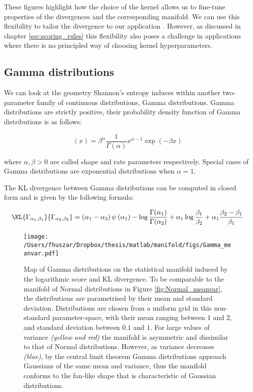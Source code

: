 These figures highlight how the choice of the kernel allows us to fine-tune properties of the divergences and the corresponding manifold. We can use this flexibility to tailor the divergence to our application \citep{tailoring}. However, as discussed in chapter \ref{sec:scoring_rules} this flexibility also poses a challenge in applications where there is no principled way of choosing kernel hyperparameters.

\subsection{Gamma distributions}

We can look at the geometry Shannon's entropy induces within another two-parameter family of continuous distributions, Gamma distributions. Gamma distributions are strictly positive, their probability density function of Gamma distributions is as follows:

\begin{equation}
(x) = \beta^{\alpha}\frac{1}{\Gamma(\alpha)} x^{\alpha-1} \exp(-\beta x)
\end{equation}

where $\alpha,\beta > 0$ are called shape and rate parameters respectively. Special cases of Gamma distributions are exponential distributions when $\alpha=1$.

The KL divergence between Gamma distributions can be computed in closed form and is given by the following formula:

\begin{equation}
	\KL{\Gamma_{\alpha_1,\beta_1}}{\Gamma_{\alpha_2,\beta_2}} = \left(\alpha_1 - \alpha_2\right)\psi\left(\alpha_1\right) - \log\frac{\Gamma(\alpha_1)}{\Gamma(\alpha_2)} + \alpha_1\log\frac{\beta_1}{\beta_2} + \alpha_1\frac{\beta_2 - \beta_1}{\beta_1} \label{eqn:KL_Gamma}
\end{equation}

\begin{figure} %
	\begin{center}
	\texttt{[image: /Users/fhuszar/Dropbox/thesis/matlab/manifold/figs/Gamma\_meanvar.pdf]}
	\end{center}
	\caption[Map of Gamma distributions using the logarithmic score]{Map of Gamma distributions on the statistical manifold induced by the logarithmic score and KL divergence. To be comparable to the manifold of Normal distributions in Figure \ref{fig:Normal_meanvar}, the distributions are parametrised by their mean and standard deviation. Distributions are chosen from a uniform grid in this non-standard parameter-space, with their mean ranging between $1$ and $2$, and standard deviation between $0.1$ and $1$. For large values of variance \emph{(yellow and red)} the manifold is asymmetric and dissimilar to that of Normal distributions. However, as variance decreases \emph{(blue)}, by the central limit theorem Gamma distributions approach Gaussians of the same mean and variance, thus the manifold conforms to the fan-like shape that is characteristic of Gaussian distributions.}
\end{figure}

